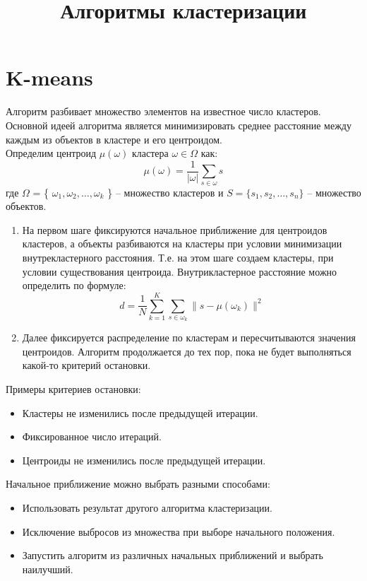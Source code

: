 \documentclass[12pt, a4paper]{article}
\title{Алгоритмы кластеризации}
\date{}
\begin{document}
\maketitle

\section*{K-means}
Алгоритм разбивает множество элементов на известное число кластеров. Основной идеей алгоритма является минимизировать среднее расстояние между каждым из объектов в кластере и его центроидом. 
\\Определим центроид \( \mu(\omega) \) кластера \(\omega \in \varOmega \) как: 
\[
        \mu(\omega) = \frac{1}{|\omega|} \sum_{s \in \omega} s
\]
где \( \varOmega \) = \{ \( \omega_1, \omega_2, \ldots, \omega_k \) \} -- множество кластеров и \( S = \{ s_1, s_2, \ldots , s_n \} \) -- множество объектов. 
\begin{enumerate}
\item На первом шаге фиксируются начальное приближение для центроидов кластеров, а объекты разбиваются на кластеры при условии минимизации внутрекластерного расстояния. Т.е. на этом шаге создаем кластеры, при условии существования центроида. Внутрикластерное расстояние можно определить по формуле:
\[
             d = \frac{1}{N} \sum_{k=1}^K \sum_{s \in \omega_k} \|s - \mu(\omega_k)\|^2
\]

\item Далее фиксируется распределение по кластерам и пересчитываются значения центроидов. 
Алгоритм продолжается до тех пор, пока не будет выполняться какой-то критерий остановки.
\end{enumerate}

Примеры критериев остановки: 


\begin{itemize} 
\item Кластеры не изменились после предыдущей итерации.

 
\item Фиксированное число итераций.


\item Центроиды не изменились после предыдущей итерации.
\end{itemize}

Начальное приближение можно выбрать разными способами:


\begin{itemize} 
\item Использовать результат другого алгоритма кластеризации.


\item Исключение выбросов из множества при выборе начального положения. 


\item Запустить алгоритм из различных начальных приближений и выбрать наилучший.
\end{itemize}
\end{document}
